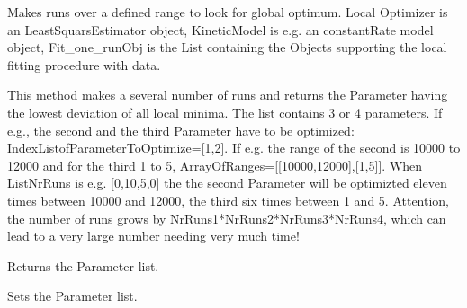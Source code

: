 \documentclass[letterpaper,10pt,english]{sphinxmanual}
\begin{document}
\begin{fulllineitems}
\label{FittingClasses:Fitter.GlobalOptimizer}
Makes runs over a defined range to look for global optimum. Local Optimizer is an LeastSquarsEstimator object, KineticModel is e.g. an constantRate model object, Fit\_one\_runObj is the List containing the Objects supporting the local fitting procedure with data.

\begin{fulllineitems}
\label{FittingClasses:Fitter.GlobalOptimizer.GenerateOptima}
This method makes a several number of runs and returns the Parameter having the lowest deviation of all local minima. The list contains 3 or 4 parameters. If e.g., the second and the third Parameter have to be optimized: IndexListofParameterToOptimize={[}1,2{]}. If e.g. the range of the second is 10000 to 12000 and for the third 1 to 5,  ArrayOfRanges={[}{[}10000,12000{]},{[}1,5{]}{]}. When ListNrRuns is e.g. {[}0,10,5,0{]} the the second Parameter will be optimizted eleven times between 10000 and 12000, the third six times between 1 and 5. Attention, the number of runs grows by NrRuns1*NrRuns2*NrRuns3*NrRuns4, which can lead to a very large number needing very much time!

\end{fulllineitems}


\begin{fulllineitems}
\label{FittingClasses:Fitter.GlobalOptimizer.ParamList}
Returns the Parameter list.

\end{fulllineitems}


\begin{fulllineitems}
\label{FittingClasses:Fitter.GlobalOptimizer.setParamList}
Sets the Parameter list.

\end{fulllineitems}


\end{fulllineitems}
\end{document}

